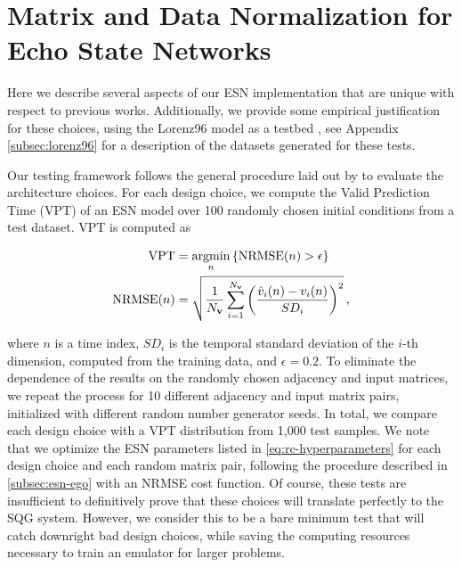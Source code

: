 \documentclass[draft]{agujournal2019}
\newcommand{\citep}{\cite}
\newcommand{\citet}{\citeA}
\begin{document}
\appendix
\section{Matrix and Data Normalization for Echo State Networks}
\label{sec:new_methods}

Here we describe several aspects of our ESN implementation that are
unique with respect to previous works.
Additionally, we provide some empirical justification for these choices, using
the Lorenz96 model as a testbed \citep{lorenz_predictability_1996}, see
Appendix \cref{subsec:lorenz96} for a description of the datasets generated for these
tests.

Our testing framework follows the general procedure laid out
by \citet{platt_systematic_2022} to evaluate the architecture choices.
For each design choice, we compute the Valid Prediction Time (VPT) of
an ESN model over 100 randomly chosen initial conditions from a test dataset.
VPT is computed as
\begin{linenomath*}\begin{equation*}
    \begin{aligned}
        \text{VPT} &= \operatorname*{argmin}_{n} \left\{ \text{NRMSE}(n) > \epsilon \right\} \\
        \text{NRMSE}(n) &= \sqrt{\dfrac{1}{N_{\mathbf{v}}}\sum_{i=1}^{N_{\mathbf{v}}}\left(
            \dfrac{\hat{v}_i(n) - v_i(n)}{SD_i}
            \right)^2
        } \, ,
    \end{aligned}
\end{equation*}\end{linenomath*}
where $n$ is a time index, $SD_i$ is the temporal standard deviation of the $i$-th dimension,
computed from the training data, and $\epsilon=0.2$.
To eliminate the dependence of the results on the randomly chosen adjacency and
input matrices, we repeat the process for 10 different adjacency and input
matrix pairs, initialized with different random number generator seeds.
In total, we compare each design choice with a VPT distribution from 1,000 test samples.
We note that we optimize the ESN parameters listed in
\cref{eq:rc-hyperparameters} for each design choice and each random matrix pair,
following the procedure described in \cref{subsec:esn-ego} with an NRMSE cost
function.
Of course, these tests are insufficient to definitively prove that these choices
will translate perfectly to the SQG system.
However, we consider this to be a bare minimum test that will catch downright bad
design choices, while saving the computing resources necessary to train an
emulator for larger problems.
\end{document}
